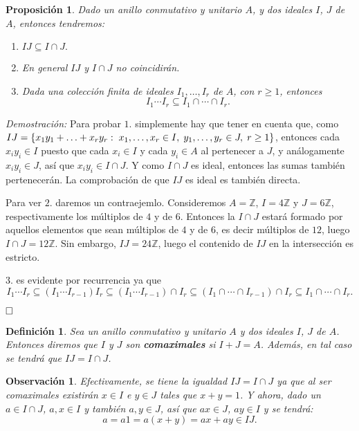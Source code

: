 \documentclass[12pt]{article}
\newtheorem{proposition}[theorem]{Proposición}
\newtheorem{definition}[theorem]{Definición}
\newtheorem{observation}{Observación}[theorem]
\begin{document}
\begin{proposition} Dado un anillo conmutativo y unitario $A$, y dos ideales $I$, $J$ de $A$, entonces tendremos: \begin{enumerate}
\item $IJ \subseteq I \cap J.$
\item En general $IJ$ y $I \cap J$ no coincidirán.
\item Dada una colección finita de ideales $I_{1}, \ldots, I_{r}$ de $A$, con $r \geq 1$, entonces $$I_{1} \cdots I_{r} \subseteq I_{1} \cap \cdots \cap I_{r}.$$
\end{enumerate} 
\end{proposition}
\emph{Demostración: }Para probar $1.$ simplemente hay que tener en cuenta que, como $IJ =  \lbrace x_{1}y_{1} + \ldots + x_{r}y_{r} : \hspace{0.1cm} x_{1}, \ldots, x_{r} \in I, \hspace{0.1cm} y_{1}, \ldots, y_{r} \in J, \hspace{0.1cm} r \geq 1 \rbrace$, entonces cada $x_{i}y_{i} \in I$ puesto que cada $x_{i} \in I$ y cada $y_{i} \in A$ al pertenecer a $J$, y análogamente $x_{i}y_{i} \in J$, así que $x_{i}y_{i} \in I \cap J$. Y como $I \cap J$ es ideal, entonces las sumas también pertenecerán. La comprobación de que $IJ$ es ideal es también directa.

Para ver $2.$ daremos un contraejemlo. Consideremos $A = \mathbb{Z}$, $I = 4\mathbb{Z}$ y $J = 6\mathbb{Z}$, respectivamente los múltiplos de $4$ y de $6$. Entonces la $I \cap J$ estará formado por aquellos elementos que sean múltiplos de $4$ y de $6$, es decir múltiplos de $12$, luego $I \cap J = 12\mathbb{Z}$. Sin embargo, $IJ = 24\mathbb{Z}$, luego el contenido de $IJ$ en la intersección es estricto.

$3.$ es evidente por recurrencia ya que $$I_{1} \cdots I_{r} \subseteq (I_{1} \cdots I_{r-1} ) I_{r} \subseteq (I_{1} \cdots I_{r-1} ) \cap I_{r} \subseteq (I_{1} \cap \cdots \cap I_{r-1} ) \cap I_{r} \subseteq I_{1} \cap \cdots \cap I_{r}.$$

$\hfill \square$

\begin{definition} \label{eq:comax} Sea un anillo conmutativo y unitario $A$ y dos ideales $I$, $J$ de $A$. Entonces diremos que $I$ y $J$ son \textbf{comaximales} si $I + J = A$. Además, en tal caso se tendrá que $IJ = I \cap J$.
\end{definition}

\begin{observation} Efectivamente, se tiene la igualdad $IJ = I \cap J$ ya que al ser comaximales existirán $x \in I$ e $y \in J$ tales que $x +y = 1$. Y ahora, dado un $a \in I \cap J$, $a,x \in I$ y también $a, y \in J$, así que $ax \in J$, $ay \in I$ y se tendrá: $$a = a1 = a(x+y) = ax + ay \in IJ.$$
\end{observation}
\end{document}
